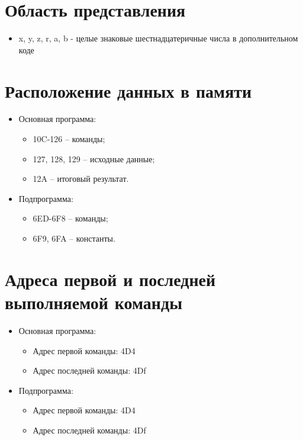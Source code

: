 \documentclass{article}
\begin{document}
\section{Область представления}
\begin{itemize}
  \item x, y, z, r, a, b - целые знаковые шестнадцатеричные числа в дополнительном коде
\end{itemize}

\section{Расположение данных в памяти}

\begin{itemize}
  \item Основная программа:
        \begin{itemize}
          \item 10C-126 – команды;
          \item 127, 128, 129 – исходные данные;
          \item 12A – итоговый результат.
        \end{itemize}
  \item Подпрограмма:
        \begin{itemize}
          \item 6ED-6F8 – команды;
          \item 6F9, 6FA – константы.
        \end{itemize}
\end{itemize}

\section{Адреса первой и последней выполняемой команды}

\begin{itemize}
  \item Основная программа:
        \begin{itemize}
          \item Адрес первой команды: 4D4
          \item Адрес последней команды: 4Df
        \end{itemize}
  \item Подпрограмма:
        \begin{itemize}
          \item Адрес первой команды: 4D4
          \item Адрес последней команды: 4Df
        \end{itemize}
\end{itemize}
\end{document}
